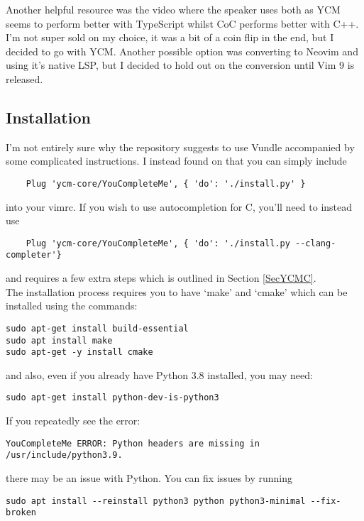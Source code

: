 Another helpful resource was the video \cite{primeagen2020cocvsycm} where the
speaker uses both as YCM seems to perform better with TypeScript whilst CoC
performs better with C++. I'm not super sold on my choice, it was a bit of a
coin flip in the end, but I decided to go with YCM. Another possible option was
converting to Neovim and using it's native LSP, but I decided to hold out on the
conversion until Vim 9 is released.

\subsection{Installation} \label{SecYCMInstallation}
I'm not entirely sure why the repository \cite{ycmcore2017ycm} suggests to use
Vundle accompanied by some complicated instructions. I instead found on
\cite{yves2020why} that you can simply include
\begin{lstlisting}
    Plug 'ycm-core/YouCompleteMe', { 'do': './install.py' }
\end{lstlisting}
into your vimrc. If you wish to use autocompletion for C, you'll need to instead
use
\begin{lstlisting}
    Plug 'ycm-core/YouCompleteMe', { 'do': './install.py --clang-completer'}
\end{lstlisting}
and requires a few extra steps which is outlined in Section \ref{SecYCMC}.\\

The installation process requires you to have `make' and
`cmake' which can be installed using the commands:
\begin{lstlisting}
sudo apt-get install build-essential
sudo apt install make
sudo apt-get -y install cmake
\end{lstlisting}
and also, even if you already have Python 3.8 installed, you may need:
\begin{lstlisting}
sudo apt-get install python-dev-is-python3
\end{lstlisting}
If you repeatedly see the error:
\begin{lstlisting}
YouCompleteMe ERROR: Python headers are missing in /usr/include/python3.9.
\end{lstlisting}
there may be an issue with Python. You can fix issues by running
\begin{lstlisting}
sudo apt install --reinstall python3 python python3-minimal --fix-broken
\end{lstlisting}

